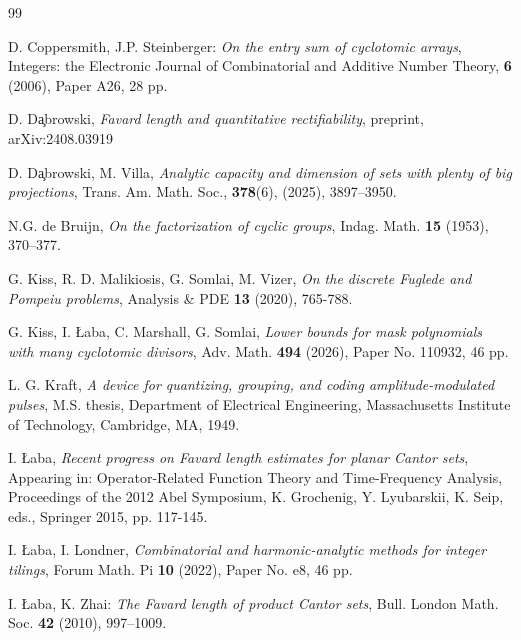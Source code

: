 \documentclass[12pt]{amsart}
\numberwithin{equation}{section}
\begin{document}
\begin{thebibliography}{99}

 D. Coppersmith, J.P. Steinberger: {\it On the entry sum of cyclotomic arrays}, Integers: the Electronic Journal of Combinatorial and Additive Number Theory, {\bf 6} (2006), Paper A26, 28 pp.

D. D\c{a}browski, {\it Favard length and quantitative rectifiability}, preprint, arXiv:2408.03919

 D. D\c{a}browski, M. Villa, {\it Analytic capacity and dimension of sets with plenty of big projections}, Trans. Am. Math. Soc., {\bf 378}(6), (2025), 3897--3950.


 N.G. de Bruijn, {\it On the factorization of cyclic groups}, Indag. Math. {\bf 15} (1953), 370--377.



 G. Kiss, R. D. Malikiosis, G. Somlai, M. Vizer, 
{\it On the discrete Fuglede and Pompeiu problems}, Analysis \& PDE {\bf 13} (2020), 765-788.

 G. Kiss, I. {\L}aba, C. Marshall, G. Somlai, {\it Lower bounds for mask polynomials with many cyclotomic divisors}, Adv. Math. {\bf 494} (2026), Paper No. 110932, 46 pp. 

 L. G. Kraft, {\it A device for quantizing, grouping, and coding amplitude-modulated pulses}, M.S. thesis, Department of Electrical Engineering, Massachusetts Institute of Technology, Cambridge, MA, 1949.

 I. {\L}aba, {\it Recent progress on Favard length estimates for planar Cantor sets}, Appearing in: Operator-Related Function Theory and Time-Frequency Analysis, Proceedings of the 2012 Abel Symposium, K. Grochenig, Y. Lyubarskii, K. Seip, eds., Springer 2015, pp. 117-145.


 I. {\L}aba, I. Londner, {\it Combinatorial and harmonic-analytic methods for integer tilings},
Forum Math. Pi {\bf 10} (2022), Paper No. e8, 46 pp.

 I. {\L}aba, K. Zhai: {\it The Favard length of product Cantor sets},
Bull. London Math. Soc. {\bf 42} (2010), 997--1009.

%


\end{thebibliography}
\end{document}
